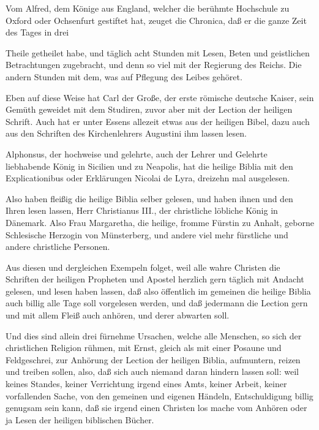 Vom Alfred, dem Könige aus England, welcher die berühmte Hochschule zu Oxford oder Ochsenfurt gestiftet hat, zeuget die Chronica, daß er die ganze Zeit des Tages in drei


Theile getheilet habe, und täglich acht Stunden mit Lesen, Beten und geistlichen Betrachtungen zugebracht, und denn so viel mit der Regierung des Reichs. Die andern Stunden mit dem, was auf Pflegung des Leibes gehöret.

Eben auf diese Weise hat Carl der Große, der erste römische deutsche Kaiser, sein Gemüth geweidet mit dem Studiren, zuvor aber mit der Lection der heiligen Schrift. Auch hat er unter Essens allezeit etwas aus der heiligen Bibel, dazu auch aus den Schriften des Kirchenlehrers Augustini ihm lassen lesen.

Alphonsus, der hochweise und gelehrte, auch der Lehrer und Gelehrte liebhabende König in Sicilien und zu Neapolis, hat die heilige Biblia mit den Explicationibus oder Erklärungen Nicolai de Lyra, dreizehn mal ausgelesen.

Also haben fleißig die heilige Biblia selber gelesen, und haben ihnen und den Ihren lesen lassen, Herr Christianus III., der christliche löbliche König in Dänemark. Also Frau Margaretha, die heilige, fromme Fürstin zu Anhalt, geborne Schlesische Herzogin von Münsterberg, und andere viel mehr fürstliche und andere christliche Personen.

Aus diesen und dergleichen Exempeln folget, weil alle wahre Christen die Schriften der heiligen Propheten und Apostel herzlich gern täglich mit Andacht gelesen, und lesen haben lassen, daß also öffentlich im gemeinen die heilige Biblia auch billig alle Tage soll vorgelesen werden, und daß jedermann die Lection gern und mit allem Fleiß auch anhören, und derer abwarten soll.

Und dies sind allein drei fürnehme Ursachen, welche alle Menschen, so sich der christlichen Religion rühmen, mit Ernst, gleich als mit einer Posaune und Feldgeschrei, zur Anhörung der Lection der heiligen Biblia, aufmuntern, reizen und treiben sollen, also, daß sich auch niemand daran hindern lassen soll: weil keines Standes, keiner Verrichtung irgend eines Amts, keiner Arbeit, keiner vorfallenden Sache, von den gemeinen und eigenen Händeln, Entschuldigung billig genugsam sein kann, daß sie irgend einen Christen los mache vom Anhören oder ja Lesen der heiligen biblischen Bücher.

